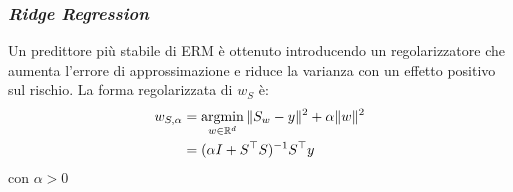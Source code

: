 \subsubsection{\textit{Ridge Regression}}
Un predittore più stabile di ERM è ottenuto introducendo un regolarizzatore
che aumenta l'errore di approssimazione e riduce la varianza con un effetto
positivo sul rischio. La forma regolarizzata di $w_S$ è:
$$\begin{aligned}
   w_{S,\alpha} &= \operatorname*{argmin}_{w\in\mathbb{R}^d}\|S_w-y\|^2+\alpha\|w\|^2\\
   &= (\alpha I+S^\top S)^{-1}S^\top y
\end{aligned}$$
con $\alpha>0$